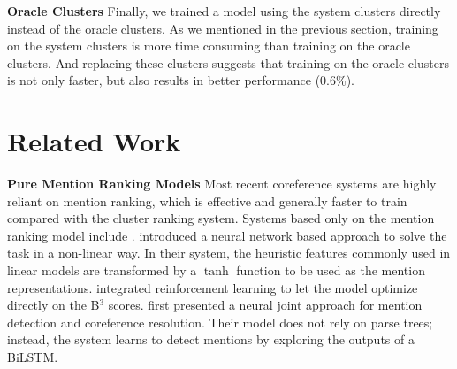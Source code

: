 \documentclass[10pt, a4paper]{article}
\begin{document}
\textbf{Oracle Clusters} Finally, we trained a model using the system clusters directly instead of the oracle clusters. 
As we mentioned in the previous section,  training on the system clusters is more time consuming than training on the oracle clusters. 
And replacing these clusters  suggests that training on the oracle clusters is not only faster, but also results in  better performance (0.6\%). 



\section{Related Work}
\textbf{Pure Mention Ranking Models} Most recent coreference systems are highly reliant on  mention ranking, which is
effective and generally faster to train  
compared with the cluster ranking system. 
Systems  based only on the mention ranking model include \cite{wiseman2015learning,clark2016improving,lee2017end}.  introduced a neural network based approach to solve the task in a non-linear way. 
In their system, the heuristic features commonly used in  linear models are transformed by a $\tanh$ function to be used as the mention representations. 
 integrated  reinforcement learning to let the model optimize directly on the B$^3$ scores. 
 first presented a neural joint approach for mention detection and coreference resolution. Their model does not rely on  parse trees; instead, the system learns to detect  mentions by exploring the outputs of a BiLSTM. 
\end{document}
